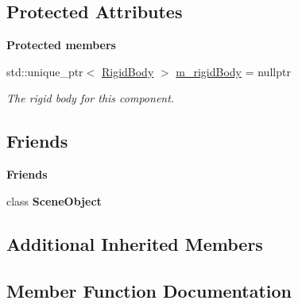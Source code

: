 \subsection*{Protected Attributes}
\begin{Indent}\textbf{ Protected members}\par
\begin{DoxyCompactItemize}
\item 
\mbox{\label{classrev_1_1_rigid_body_component_a2df6d63dd42a75f3a9ef3c6eb3d45017}} 
std\+::unique\+\_\+ptr$<$ \mbox{\hyperlink{classrev_1_1_rigid_body}{Rigid\+Body}} $>$ \mbox{\hyperlink{classrev_1_1_rigid_body_component_a2df6d63dd42a75f3a9ef3c6eb3d45017}{m\+\_\+rigid\+Body}} = nullptr
\begin{DoxyCompactList}\small\item\em The rigid body for this component. \end{DoxyCompactList}\end{DoxyCompactItemize}
\end{Indent}
\subsection*{Friends}
\begin{Indent}\textbf{ Friends}\par
\begin{DoxyCompactItemize}
\item 
\mbox{\label{classrev_1_1_rigid_body_component_a737b3cb474f324a74e7da2d3aeca10c9}} 
class {\bfseries Scene\+Object}
\end{DoxyCompactItemize}
\end{Indent}
\subsection*{Additional Inherited Members}


\subsection{Member Function Documentation}
\mbox{\label{classrev_1_1_rigid_body_component_aac4681f78e6e53a6fceae27502b08bc5}} 
